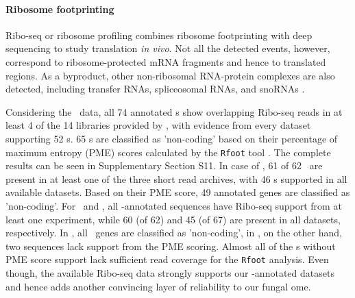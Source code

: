 \paragraph{\textbf{Ribosome footprinting}}
Ribo-seq or ribosome profiling combines ribosome footprinting with deep
sequencing \cite{Ingolia:2009,Ingolia:2012} to study translation \textit{in
  vivo}. Not all the detected events, however, correspond to
ribosome-protected mRNA fragments and hence to translated regions.  As a
byproduct, other non-ribosomal RNA-protein complexes are also detected,
including transfer RNAs, spliceosomal RNAs, and snoRNAs \cite{Ingolia:2014,
  Ji:2016}.

Considering the \sce\ data, all 74 annotated \sno s show overlapping
Ribo-seq reads in at least 4 of the 14 libraries provided by
\cite{Ingolia:2009}, with evidence from every dataset supporting 52 \sno
s. 65 \sno s are classified as 'non-coding' based on their percentage of
maximum entropy (PME) scores calculated by the \texttt{Rfoot} tool
\cite{Ji:2016}. The complete results can be seen in Supplementary Section
S11. In case of \spo, 61 of 62 \sno\ are present in at least one of the
three short read archives, with 46 \sno s supported in all available
datasets. Based on their PME score, 49 annotated genes are classified as
'non-coding'. For \aca\ and \calb , all \snostrip -annotated sequences have
Ribo-seq support from at least one experiment, while 60 (of 62) and 45 (of
67) are present in all datasets, respectively. In \aca, all \sno\ genes are
classified as 'non-coding', in \calb, on the other hand, two sequences lack
support from the PME scoring. Almost all of the \sno s without PME score
support lack sufficient read coverage for the \texttt{Rfoot} analysis.
Even though, the available Ribo-seq data strongly supports our \snostrip
-annotated datasets and hence adds another convincing layer of reliability
to our fungal \sno ome.  

%
%
%

